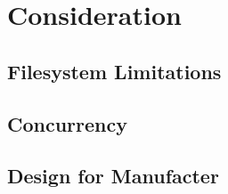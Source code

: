 
\chapter{Consideration} %


\section{Filesystem Limitations}








\section{Concurrency}



\section{Design for Manufacter}


